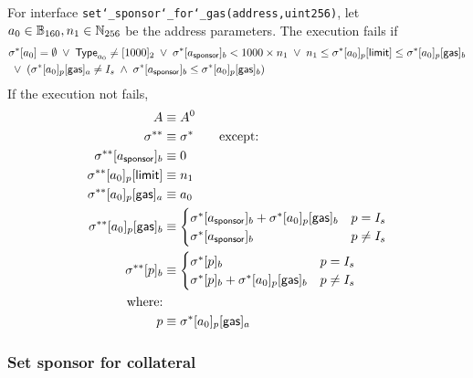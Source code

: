 For interface {\tt set\char`_sponsor\char`_for\char`_gas(address,uint256)}, let $a_0\in \mathbb{B}_{160},n_1\in \mathbb{N}_{256}$ be the address parameters. The execution fails if 
	\begin{align}
		& \mathbf{\sigma}^*[a_0]=\emptyset \;\vee\; \mathsf{Type}_{a_0}\neq[1000]_2 \;\vee\; \mathbf{\sigma}^*[a_{\sf sponsor}]_b < 1000\times n_1 \;\vee\; n_1\le \mathbf{\sigma}^*[a_0]_p[{\sf limit}]\le \mathbf{\sigma}^*[a_0]_p[{\sf gas}]_b \notag \\ 
		& \;\vee\; (\mathbf{\sigma}^*[a_0]_p[{\sf gas}]_a \neq I_s \;\wedge\; \mathbf{\sigma}^*[a_{\sf sponsor}]_b\le \mathbf{\sigma}^*[a_0]_p[{\sf gas}]_b)  
	\end{align}
	If the execution not fails, 
		\begin{align}
			A & \equiv A^0 \\
			\mathbf{\sigma}^{**} &\equiv \mathbf{\sigma}^* \qquad \mbox{except:}\\
			\mathbf{\sigma}^{**}[a_{\sf sponsor}]_b &\equiv 0 \\ 
			\mathbf{\sigma}^{**}[a_0]_p[{\sf limit}] &\equiv n_1\\ 
			\mathbf{\sigma}^{**}[a_0]_p[{\sf gas}]_a &\equiv a_0\\ 
			\mathbf{\sigma}^{**}[a_0]_p[{\sf gas}]_b &\equiv \begin{cases}
				\mathbf{\sigma}^*[a_{\sf sponsor}]_b + \mathbf{\sigma}^*[a_0]_p[{\sf gas}]_b& p = I_s\\ 
				\mathbf{\sigma}^*[a_{\sf sponsor}]_b& p \neq I_s
			\end{cases}\\ 
			\mathbf{\sigma}^{**}[p]_b &\equiv \begin{cases}
				\mathbf{\sigma}^*[p]_b & p = I_s\\ 
				\mathbf{\sigma}^*[p]_b + \mathbf{\sigma}^*[a_0]_p[{\sf gas}]_b& p \neq I_s
			\end{cases}\\
			\mbox{where:}& \\
			p & \equiv \mathbf{\sigma}^*[a_0]_p[{\sf gas}]_a
		\end{align}
    
\subsubsection{Set sponsor for collateral}

